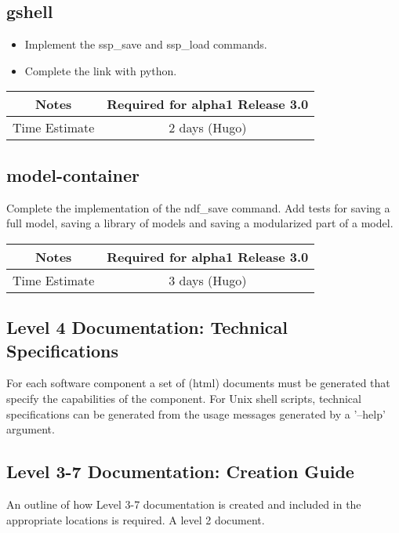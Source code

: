 \documentclass[12pt]{article}
\begin{document}
\subsection{gshell}
\begin{itemize}
\item Implement the ssp\_save and ssp\_load commands.
\item Complete the link with python.
\end{itemize}

{
  \vspace{5mm}
  \centering
  \begin{tabular}{|c|c|}
    \hline
    Notes
    & Required for alpha1 Release 3.0 \\
    \hline
    Time Estimate
    & 2 days (Hugo) \\
    \hline
  \end{tabular}
}


\subsection{model-container}
Complete the implementation of the ndf\_save command.  Add tests for
saving a full model, saving a library of models and saving a
modularized part of a model.

{
  \vspace{5mm}
  \centering
  \begin{tabular}{|c|c|}
    \hline
    Notes
    & Required for alpha1 Release 3.0 \\
    \hline
    Time Estimate
    & 3 days (Hugo) \\
    \hline
  \end{tabular}
}


\subsection{Level 4 Documentation: Technical Specifications}

For each software component a set of (html) documents must be
generated that specify the capabilities of the component.  For Unix
shell scripts, technical specifications can be generated from the
usage messages generated by a '--help' argument.


\subsection{Level 3-7 Documentation: Creation Guide}

An outline of how Level 3-7 documentation is created and included in
the appropriate locations is required.  A level 2 document.
\end{document}
